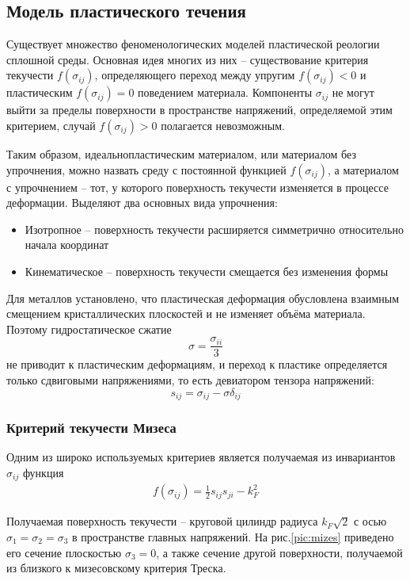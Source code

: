 \subsection{Модель пластического течения}
Существует множество феноменологических моделей пластической реологии сплошной среды.
Основная идея многих из них \cite{resler,kukudganov} -- существование критерия текучести $f(\sigma_{ij})$, определяющего переход между упругим $f(\sigma_{ij})<0$ и пластическим $f(\sigma_{ij})=0$ поведением материала. Компоненты $\sigma_{ij}$ не могут выйти за пределы поверхности в пространстве напряжений, определяемой этим критерием, случай $f(\sigma_{ij})>0$ полагается невозможным.
 
Таким образом, идеальнопластическим материалом, или материалом без упрочнения, можно назвать среду с постоянной функцией $f(\sigma_{ij})$, а материалом с упрочнением -- тот, у которого поверхность текучести изменяется в процессе деформации. Выделяют два основных вида упрочнения:
\begin{itemize}
\item Изотропное -- поверхность текучести расширяется симметрично относительно начала координат
\item Кинематическое -- поверхность текучести смещается без изменения формы
\end{itemize} 

Для металлов установлено, что пластическая деформация обусловлена взаимным смещением кристаллических плоскостей и не изменяет объёма материала. Поэтому гидростатическое сжатие $$\sigma = \frac{\sigma_{ii}}{3}$$ не приводит к пластическим деформациям, и переход к пластике определяется только сдвиговыми напряжениями, то есть девиатором тензора напряжений: $$s_{ij} = \sigma_{ij} - \sigma\delta_{ij}$$ 
\subsubsection{Критерий текучести Мизеса}
Одним из широко используемых критериев является получаемая из инвариантов $\sigma_{ij}$ функция
\begin{eqnarray}
\label{mizes}
f(\sigma_{ij}) = \frac{1}{2}s_{ij}s_{ji} - k^2_F
\end{eqnarray}

Получаемая поверхность текучести -- круговой цилиндр радиуса $k_F\sqrt{2}$ с осью $\sigma_1 = \sigma_2 = \sigma_3$ в пространстве главных напряжений. На рис.\ref{pic:mizes} приведено его сечение плоскостью $\sigma_3 = 0$, а также сечение другой поверхности, получаемой из близкого к мизесовскому критерия Треска.

